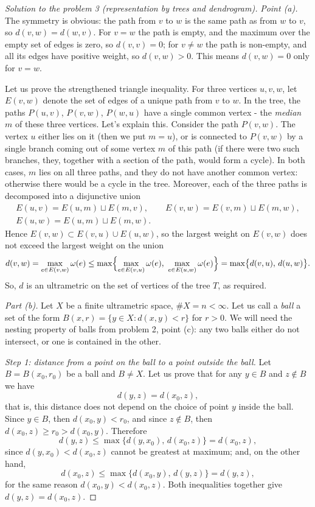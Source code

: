\documentclass[a4paper,12pt]{report}
\begin{document}
\begin{proof}[Solution to the problem \textup{3} \textup{(}representation by trees and dendrogram\textup{)}]
\textit{Point \textup{(a)}.} The symmetry is obvious\textup{:} the path from $v$ to $w$ is the same path as from $w$ to $v$, so $d(v,w)=d(w,v)$. For $v=w$ the path is empty, and the maximum over the empty set of edges is zero, so $d(v,v)=0$\textup{;} for $v\ne w$ the path is non-empty, and all its edges have positive weight, so $d(v,w)>0$. This means $d(v,w)=0$ only for $v=w$.

Let us prove the strengthened triangle inequality. For three vertices $u,v,w$, let $E(v,w)$ denote the set of edges of a unique path from $v$ to $w$. In the tree, the paths $P(u,v)$, $P(v,w)$, $P(w,u)$ have a single common vertex - the \emph{median} $m$ of these three vertices. Let's explain this. Consider the path $P(v,w)$. The vertex $u$ either lies on it \textup{(}then we put $m=u$\textup{)}, or is connected to $P(v,w)$ by a single branch coming out of some vertex $m$ of this path \textup{(}if there were two such branches, they, together with a section of the path, would form a cycle\textup{)}. In both cases, $m$ lies on all three paths, and they do not have another common vertex\textup{:} otherwise there would be a cycle in the tree. Moreover, each of the three paths is decomposed into a disjunctive union
\[
\begin{gathered}
E(u,v)=E(u,m)\sqcup E(m,v),\qquad E(v,w)=E(v,m)\sqcup E(m,w),\\
E(u,w)=E(u,m)\sqcup E(m,w) .
\end{gathered}
\]
Hence $E(v,w)\subset E(v,u)\cup E(u,w)$, so the largest weight on $E(v,w)$ does not exceed the largest weight on the union
\[
d(v,w)=\max_{e\in E(v,w)}\omega(e)\le\max\Bigl\{\max_{e\in E(v,u)}\omega(e),\ \max_{e\in E(u,w)}\omega(e)\Bigr\}=\max\bigl\{d(v,u),\,d(u,w)\bigr\} .
\]
So, $d$ is an ultrametric on the set of vertices of the tree $T$, as required.

\textit{Part \textup{(b)}.} Let $X$ be a finite ultrametric space, $\#X=n<\infty$. Let us call a \emph{ball} a set of the form $B(x,r)=\{y\in X:d(x,y)<r\}$ for $r>0$. We will need the nesting property of balls from problem \textup{2}, point \textup{(c)}\textup{:} any two balls either do not intersect, or one is contained in the other.

\textit{Step \textup{1}\textup{:} distance from a point on the ball to a point outside the ball.} Let $B=B(x_0,r_0)$ be a ball and $B\ne X$. Let us prove that for any $y\in B$ and $z\notin B$ we have
\[
d(y,z)=d(x_0,z),
\]
that is, this distance does not depend on the choice of point $y$ inside the ball. Since $y\in B$, then $d(x_0,y)<r_0$, and since $z\notin B$, then $d(x_0,z)\ge r_0>d(x_0,y)$. Therefore
\[
d(y,z)\le\max\bigl\{d(y,x_0),\,d(x_0,z)\bigr\}=d(x_0,z),
\]
since $d(y,x_0)<d(x_0,z)$ cannot be greatest at maximum\textup{;} and, on the other hand,
\[
d(x_0,z)\le\max\bigl\{d(x_0,y),\,d(y,z)\bigr\}=d(y,z),
\]
for the same reason $d(x_0,y)<d(x_0,z)$. Both inequalities together give $d(y,z)=d(x_0,z)$.


\end{proof}
\end{document}

